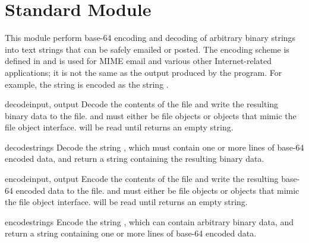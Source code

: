 \section{Standard Module }
\label{module-base64}

This module perform base-64 encoding and decoding of arbitrary binary
strings into text strings that can be safely emailed or posted.  The
encoding scheme is defined in  and is used for MIME email and
various other Internet-related applications; it is not the same as the
output produced by the  program.  For example, the
string  is encoded as the string
.  


\begin{funcdesc}{decode}{input, output}
Decode the contents of the  file and write the resulting
binary data to the  file.
 and  must either be file objects or objects that
mimic the file object interface.  will be read until
 returns an empty string.
\end{funcdesc}

\begin{funcdesc}{decodestring}{s}
Decode the string , which must contain one or more lines of
base-64 encoded data, and return a string containing the resulting
binary data.
\end{funcdesc}

\begin{funcdesc}{encode}{input, output}
Encode the contents of the  file and write the resulting
base-64 encoded data to the  file.
 and  must either be file objects or objects that
mimic the file object interface.  will be read until
 returns an empty string.
\end{funcdesc}

\begin{funcdesc}{encodestring}{s}
Encode the string , which can contain arbitrary binary data,
and return a string containing one or more lines of
base-64 encoded data.
\end{funcdesc}


